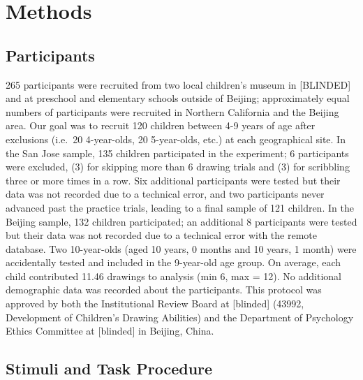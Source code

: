 \documentclass[
  english,
  man]{apa6}
\begin{document}
\hypertarget{methods}{%
\section{Methods}\label{methods}}

\hypertarget{participants}{%
\subsection{Participants}\label{participants}}

265 participants were recruited from two local children's museum in {[}BLINDED{]} and at preschool and elementary schools outside of Beijing; approximately equal numbers of participants were recruited in Northern California and the Beijing area. Our goal was to recruit 120 children between 4-9 years of age after exclusions (i.e.~20 4-year-olds, 20 5-year-olds, etc.) at each geographical site. In the San Jose sample, 135 children participated in the experiment; 6 participants were excluded, (3) for skipping more than 6 drawing trials and (3) for scribbling three or more times in a row. Six additional participants were tested but their data was not recorded due to a technical error, and two participants never advanced past the practice trials, leading to a final sample of 121 children. In the Beijing sample, 132 children participated; an additional 8 participants were tested but their data was not recorded due to a technical error with the remote database. Two 10-year-olds (aged 10 years, 0 months and 10 years, 1 month) were accidentally tested and included in the 9-year-old age group. On average, each child contributed 11.46 drawings to analysis (min 6, max = 12). No additional demographic data was recorded about the participants. This protocol was approved by both the Institutional Review Board at {[}blinded{]} (43992, Development of Children's Drawing Abilities) and the Department of Psychology Ethics Committee at {[}blinded{]} in Beijing, China.

\hypertarget{stimuli-and-task-procedure}{%
\subsection{Stimuli and Task Procedure}\label{stimuli-and-task-procedure}}
\end{document}
